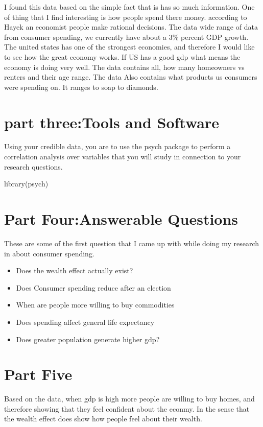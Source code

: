 \documentclass[11pt]{article}
\begin{document}
I found this data based on the simple fact that is has so much information. One of thing that I find interesting  is how people spend there money. according to Hayek an economist people make rational decisions. The data wide range of data  from consumer spending, we currently have about a 3\% percent GDP growth. The united states has one of the strongest economies, and therefore I would like to see how the great economy works. If US has a good gdp what means the economy is doing very well.  The data contains all, how many homeowners vs renters and their age range. The data Also contains what products us consumers were spending on. It ranges to soap to diamonds. 



\section{part three:Tools and Software}

Using your credible data, you are to use the psych package to perform a
correlation analysis over variables that you will study in connection to your research questions.


library(psych)


\section{Part Four:Answerable Questions}


These are some of the first question that I came up with while doing my research in about consumer spending. 
\begin{itemize}
\item Does the wealth effect actually exist? 
\item Does Consumer spending reduce after an election
\item When are people more willing to buy commodities 
\item Does spending affect general life expectancy
\item Does greater population generate higher gdp?
\end{itemize}


\section{Part Five}





Based on the data, when gdp is high more people are willing to buy homes, and therefore showing that they feel confident about the econmy. In the sense that the wealth effect does show how people feel about their wealth.  
\end{document}
